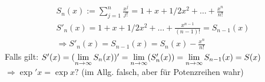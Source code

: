\begin{bem}
	\begin{align*}
		S_n(x):= \sum_{j=1}^{n} \frac{x^j}{j!} = 1 + x + 1/2x^2 + \dots + \frac{x^n}{n!}\\
		S'_n(x) = 1 + x + 1/2x^2 + \dots + \frac{x^{n-1}}{(n-1)!} = S_{n-1}(x)\\
		\Rightarrow S'_n(x) = S_{n-1}(x) = S_n(x) - \frac{x^n}{n!}
	\end{align*}
	Falls gilt: \( S'(x) = ( \lim\limits_{n\rightarrow\infty}S_n(x) )' = \lim\limits_{n\rightarrow\infty}(S'_n(x)) = \lim\limits_{n\rightarrow\infty}S_{n-1}(x) = S(x) \)
	\( \Rightarrow \exp'x = \exp x? \) (im Allg. falsch, aber für Potenzreihen wahr)
\end{bem}